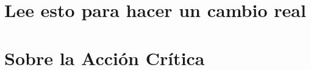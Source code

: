 \documentclass{scrbook}
\begin{document}
\part{Lee esto para hacer un cambio real}







\part{Sobre la Acción Crítica}








\appendix
\backmatter


\cleardoublepage









\end{document}
